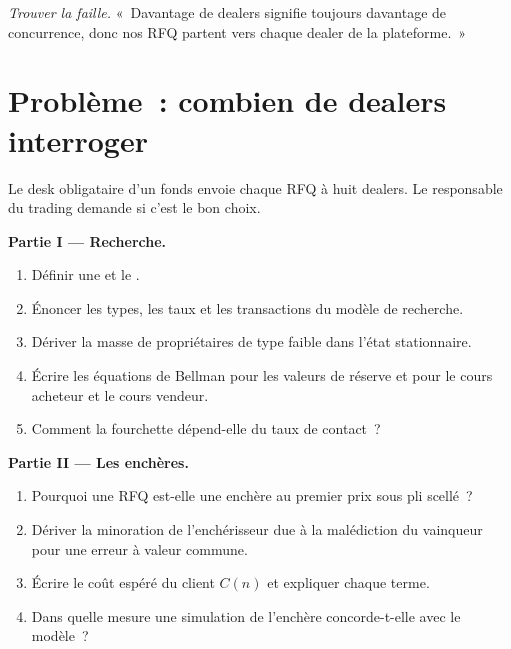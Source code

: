 \begin{exercise}[$\star\star\star$]\label{exo:mx:request-for-quote-and-dealer-markets-in-theory:8}
\emph{Trouver la faille.} «~Davantage de dealers signifie toujours davantage de concurrence, donc nos RFQ partent vers chaque dealer de la plateforme.~»
\end{exercise}

\section{Problème~: combien de dealers interroger}

\begin{problem}\label{pb:mx:request-for-quote-and-dealer-markets-in-theory:1}
Le desk obligataire d'un fonds envoie chaque RFQ à huit dealers. Le responsable du trading demande si c'est le bon choix.

\medskip\noindent\textbf{Partie I --- Recherche.}
\begin{enumerate}
\item Définir une  et le .
\item Énoncer les types, les taux et les transactions du modèle de recherche.
\item Dériver la masse de propriétaires de type faible dans l'état stationnaire.
\item Écrire les équations de Bellman pour les valeurs de réserve et pour le cours acheteur et le cours vendeur.
\item Comment la fourchette dépend-elle du taux de contact~?
\end{enumerate}

\medskip\noindent\textbf{Partie II --- Les enchères.}
\begin{enumerate}[resume]
\item Pourquoi une RFQ est-elle une enchère au premier prix sous pli scellé~?
\item Dériver la minoration de l'enchérisseur due à la malédiction du vainqueur pour une erreur à valeur commune.
\item Écrire le coût espéré du client $C(n)$ et expliquer chaque terme.
\item Dans quelle mesure une simulation de l'enchère concorde-t-elle avec le modèle~?
\end{enumerate}


\end{problem}
